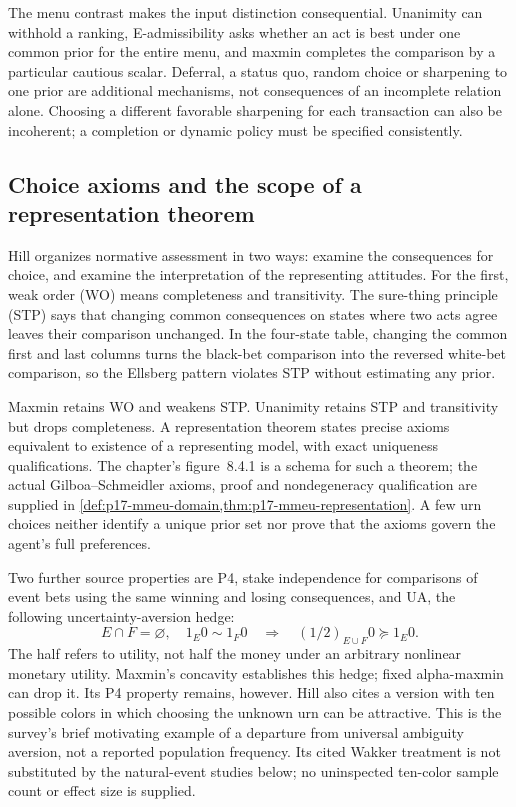 The menu contrast makes the input distinction consequential. Unanimity
can withhold a ranking, E-admissibility asks whether an act is best under
one common prior for the entire menu, and maxmin completes the comparison
by a particular cautious scalar. Deferral, a status quo, random choice or
sharpening to one prior are additional mechanisms, not consequences of
an incomplete relation alone. Choosing a different favorable sharpening
for each transaction can also be incoherent; a completion or dynamic
policy must be specified consistently.

\subsection{Choice axioms and the scope of a representation theorem}
\label{sec:p17-rat84-choice-axioms}

Hill organizes normative assessment in two ways: examine the consequences
for choice, and examine the interpretation of the representing attitudes.
For the first, weak order (WO) means completeness and transitivity. The
sure-thing principle (STP) says that changing common consequences on
states where two acts agree leaves their comparison unchanged. In the
four-state table, changing the common first and last columns turns
the black-bet comparison into the reversed white-bet comparison, so
the Ellsberg pattern violates STP without estimating any prior.

Maxmin retains WO and weakens STP. Unanimity retains STP and transitivity
but drops completeness. A representation theorem states precise axioms
equivalent to existence of a representing model, with exact uniqueness
qualifications. The chapter's figure~8.4.1 is a schema for such a theorem;
the actual Gilboa--Schmeidler axioms, proof and nondegeneracy qualification
are supplied in \cref{def:p17-mmeu-domain,thm:p17-mmeu-representation}.
A few urn choices neither identify a unique prior set nor prove that
the axioms govern the agent's full preferences.

Two further source properties are P4, stake independence for comparisons
of event bets using the same winning and losing consequences, and UA,
the following uncertainty-aversion hedge:
\[
 E\cap F=\varnothing,\quad 1_E0\sim1_F0
 \quad\Longrightarrow\quad (1/2)_{E\cup F}0\succeq1_E0.
\]
The half refers to utility, not half the money under an arbitrary
nonlinear monetary utility. Maxmin's concavity establishes this hedge;
fixed alpha-maxmin can drop it. Its P4 property remains, however.
Hill also cites a version with ten possible colors in which choosing
the unknown urn can be attractive. This is the survey's brief motivating
example of a departure from universal ambiguity aversion, not a reported
population frequency. Its cited Wakker treatment is not substituted by
the natural-event studies below; no uninspected ten-color sample count
or effect size is supplied.
\cite[Sec.~2.1 and notes~5--7, pp.~497--498, 503]{Hill2021DecisionUncertainty}


